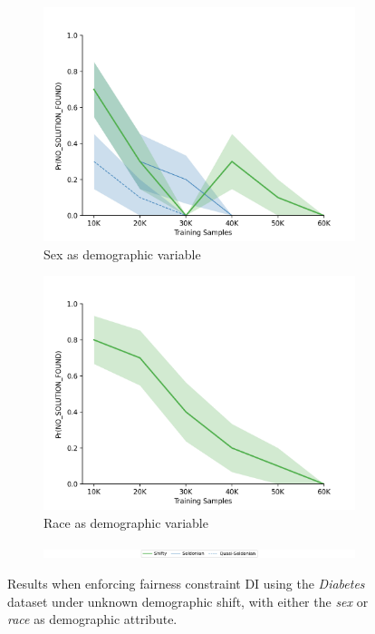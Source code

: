 \begin{figure}[ht]
    \begin{subfigure}{0.5\linewidth}
      \centering
      \includegraphics[width=0.8\linewidth]{figures/diabetes_P(NSF)/icrl_diabetes_antag_ds_rl_sex_di_P(NSF).png}
      \caption{Sex as demographic variable}
      \label{fig:diabetes_unknown_shift_sex}
    \end{subfigure}
    \begin{subfigure}{0.5\linewidth}
      \centering
      \includegraphics[width=0.8\linewidth]{figures/diabetes_P(NSF)/icrl_diabetes_antag_ds_rl_race_di_P(NSF).png}
      \caption{Race as demographic variable}
      \label{fig:diabetes_unknown_shift_race}
    \end{subfigure}
    \begin{subfigure}{\textwidth}
        \includegraphics[width=\linewidth]{figures/iclr_legend.png}
    \end{subfigure}
    \caption{Results when enforcing fairness constraint DI using the \textit{Diabetes} dataset under unknown demographic shift, with either the \textit{sex} or \textit{race} as demographic attribute. 
    }
    \label{fig:diabetes_unknown_shift}
\end{figure}



